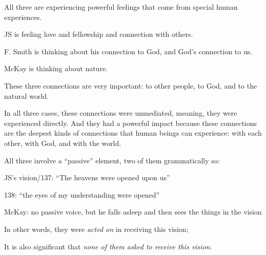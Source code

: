 \begin{compactitem}
\begin{compactitem}
\begin{compactitem}
						\end{compactitem}
					\item All three are experiencing powerful feelings that come from special human experiences.
						\begin{compactitem}
							\item JS is feeling love and fellowship and connection with others.
							\item F. Smith is thinking about his connection to God, and God's connection to us.
							\item McKay is thinking about nature.
							\item These three connections are very important: to other people, to God, and to the natural world.
							\item In all three cases, these connections were unmediated, meaning, they were experienced directly. And they had a powerful impact because these connections are the deepest kinds of connections that human beings can experience: with each other, with God, and with the world.
						\end{compactitem}
					\item All three involve a ``passive'' element, two of them grammatically so:
						\begin{compactitem}
							\item JS's vision/137: ``The heavens were opened upon us''
							\item 138: ``the eyes of my understanding were opened''
							\item McKay: no passive voice, but he falls asleep and then sees the things in the vision
							\item In other words, they were \textit{acted on} in receiving this vision; 
							\item It is also significant that \textit{none of them asked to receive this vision}. 
						\end{compactitem}
					\item {}
				\end{compactitem}
		

\end{compactitem}
